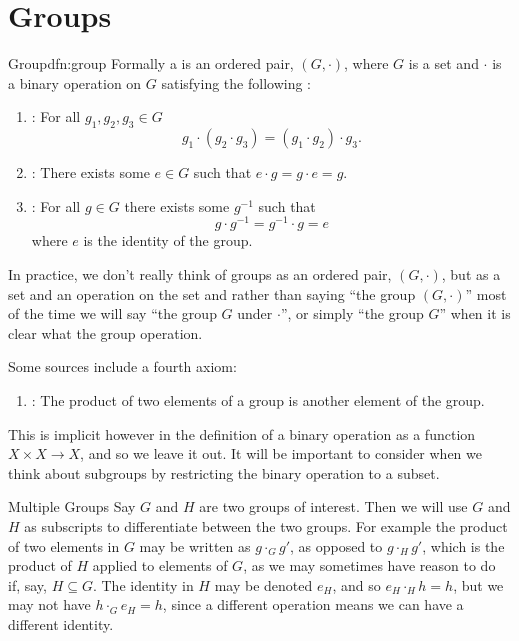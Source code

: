 \section{Groups}
\begin{dfn}{Group}{dfn:group}
    Formally a  is an ordered pair, \((G, \cdot)\), where \(G\) is a set and \(\cdot\) is a binary operation on \(G\) satisfying the following :
    \begin{enumerate}
        \item {}: For all \(g_1, g_2, g_3 \in G\)
        \begin{equation}
            g_1 \cdot (g_2 \cdot g_3) = (g_1 \cdot g_2) \cdot g_3.
        \end{equation}
        \item {}: There exists some \(e \in G\) such that \(e \cdot g = g \cdot e = g\).
        \item {}: For all \(g \in G\) there exists some \(g^{-1}\) such that
        \begin{equation}
            g\cdot g^{-1} = g^{-1} \cdot g = e
        \end{equation}
        where \(e\) is the identity of the group.
    \end{enumerate}
    \begin{rmk}
        In practice, we don't really think of groups as an ordered pair, \((G, \cdot)\), but as a set and an operation on the set and rather than saying \enquote{the group \((G, \cdot)\)} most of the time we will say \enquote{the group \(G\) under \(\cdot\)}, or simply \enquote{the group \(G\)} when it is clear what the group operation.
    \end{rmk}
    
    Some sources include a fourth axiom:
    \begin{enumerate}[resume]
        \item {}: The product of two elements of a group is another element of the group.
    \end{enumerate}
    This is implicit however in the definition of a binary operation as a function \(X \times X \to X\), and so we leave it out.
    It will be important to consider when we think about subgroups by restricting the binary operation to a subset.
\end{dfn}

\begin{ntn}{Multiple Groups}{}
    Say \(G\) and \(H\) are two groups of interest.
    Then we will use \(G\) and \(H\) as subscripts to differentiate between the two groups.
    For example the product of two elements in \(G\) may be written as \(g \cdot_G g'\), as opposed to \(g \cdot_H g'\), which is the product of \(H\) applied to elements of \(G\), as we may sometimes have reason to do if, say, \(H \subseteq G\).
    The identity in \(H\) may be denoted \(e_H\), and so \(e_H \cdot_H h = h\), but we may not have \(h \cdot_G e_H = h\), since a different operation means we can have a different identity.
\end{ntn}

